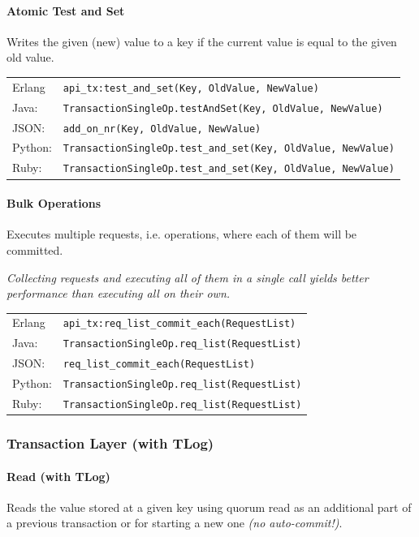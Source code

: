 \documentclass[a4paper]{scrreprt}
\newcommand{\code}[1]{\lstinline[basicstyle=\ttfamily]!#1!}
\begin{document}
\paragraph{Atomic Test and Set}
Writes the given (new) value to a key if the current value is equal to the
given old value.

\begin{tabular}{lp{14cm}}
Erlang  & \code{api_tx:test_and_set(Key, OldValue, NewValue)}\\
Java:   & \code{TransactionSingleOp.testAndSet(Key, OldValue, NewValue)}\\
JSON:   & \code{add_on_nr(Key, OldValue, NewValue)}\\
Python: & \code{TransactionSingleOp.test_and_set(Key, OldValue, NewValue)}\\
Ruby:   & \code{TransactionSingleOp.test_and_set(Key, OldValue, NewValue)}
\end{tabular}

\paragraph{Bulk Operations}
Executes multiple requests, i.e. operations, where each of them will be
committed.

\emph{Collecting requests and executing all of them in a single call yields
better performance than executing all on their own.}

\begin{tabular}{lp{14cm}}
Erlang  & \code{api_tx:req_list_commit_each(RequestList)}\\
Java:   & \code{TransactionSingleOp.req_list(RequestList)}\\
JSON:   & \code{req_list_commit_each(RequestList)}\\
Python: & \code{TransactionSingleOp.req_list(RequestList)}\\
Ruby:   & \code{TransactionSingleOp.req_list(RequestList)}
\end{tabular}

\subsubsection{Transaction Layer (with TLog)}

\paragraph{Read (with TLog)}
Reads the value stored at a given key using quorum read as an additional part
of a previous transaction or for starting a new one \emph{(no auto-commit!)}.
\end{document}

